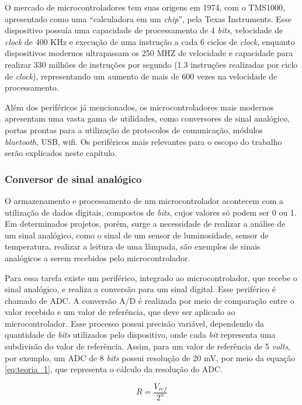 O mercado de microcontroladores tem suas origens em 1974, com o TMS1000, apresentado como uma “calculadora em um \textit{chip}”, pela Texas Instruments. Esse dispositivo possuía uma capacidade de processamento de 4 \textit{bits}, velocidade de \textit{clock} de 400 KHz e execução de uma instrução a cada 6 ciclos de \textit{clock}, enquanto dispositivos modernos ultrapassam os 250 MHZ de velocidade e capacidade para realizar 330 milhões de instruções por segundo (1.3 instruções realizadas por ciclo de \textit{clock}), representando um aumento de mais de 600 vezes na velocidade de processamento.

Além dos periféricos já mencionados, os microcontroladores mais modernos apresentam uma vasta gama de utilidades, como conversores de sinal analógico, portas prontas para a utilização de protocolos de comunicação, módulos \textit{bluetooth}, \ac{USB}, \ac{wifi}. Os periféricos mais relevantes para o escopo do trabalho serão explicados neste capítulo.

\subsubsection{Conversor de sinal analógico}

O armazenamento e processamento de um microcontrolador acontecem com a utilização de dados digitais, compostos de \textit{bits}, cujos valores só podem ser 0 ou 1. Em determinados projetos, porém, surge a necessidade de realizar a análise de um sinal analógico, como o sinal de um sensor de luminosidade, sensor de temperatura, realizar a leitura de uma lâmpada, são exemplos de sinais analógicos a serem recebidos pelo microcontrolador.

Para essa tarefa existe um periférico, integrado ao microcontrolador, que recebe o sinal analógico, e realiza a conversão para um sinal digital. Esse periférico é chamado de \ac{ADC}. A conversão A/D é realizada por meio de comparação entre o valor recebido e um valor de referência, que deve ser aplicado ao microcontrolador. Esse processo possui precisão variável, dependendo da quantidade de \textit{bits} utilizados pelo dispositivo, onde cada \textit{bit} representa uma subdivisão do valor de referência. Assim, para um valor de referência de 5 \textit{volts}, por exemplo, um \ac{ADC} de 8 \textit{bits} possui resolução de 20 mV, por meio da equação \ref{eq:teoria_1}, que representa o cálculo da resolução do \ac{ADC}.

\begin{equation}
\label{eq:teoria_1}
R = \frac{V_{ref}}{2^n}
\end{equation}

